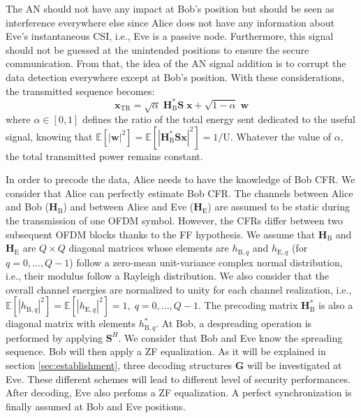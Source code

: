 \documentclass[journal,comsoc]{IEEEtran}
\newcommand{\module}[1]{\left|#1\right|}
\newcommand{\EX}[1]{\mathbb{E} \left[#1\right]}%
\newcommand{\HE}{\textbf{H}_{\text{E}}}
\newcommand{\HB}{\textbf{H}_{\text{B}}}
\newcommand{\spread}{\textbf{S}}
\newcommand{\w}{\textbf{w}}
\newcommand{\vect}[1]{\boldsymbol{\mathrm{#1}}}
\begin{document}
The AN should not have any impact at Bob's position but should be seen as interference everywhere else since Alice does not have any information about Eve's instantaneous CSI, i.e., Eve is a passive node. Furthermore, this signal should not be guessed at the unintended positions to ensure the secure communication. From that, the idea of the AN signal addition is to corrupt the data detection everywhere except at Bob's position. With these considerations, the transmitted sequence becomes:
\begin{equation}
	\textbf{x}_{\text{TR}} = \sqrt{\alpha} \;\HB^*  \spread\; \textbf{x} +  \sqrt{1-\alpha} \; \w
	\label{eq:sym_rad_AN}
\end{equation} 
where $\alpha \in [0,1]$ defines the ratio of the total energy sent dedicated to the useful signal, knowing that $\EX{\module{\w}^2} = \EX{\module{\HB^*\spread\textbf{x}}^2} =  1/\vect{U}$. Whatever the value of $\alpha$, the total transmitted power remains constant.

In order to precode the data, Alice needs to have the knowledge of Bob CFR. We consider that Alice can perfectly estimate Bob CFR. The channels between Alice and Bob ($\HB$) and between Alice and Eve ($\HE$) are assumed to be static during the transmission of one OFDM symbol. However, the CFRs differ between two subsequent OFDM blocks thanks to the FF hypothesis. We assume that $\HB$ and $\HE$ are $Q\times Q$ diagonal matrices whose elements are $h_{\text{B},q}$ and $h_{\text{E},q}$ (for $q = 0,...,Q-1$) follow a zero-mean unit-variance complex normal distribution, i.e., their modulus follow a Rayleigh distribution. We also consider that the overall channel energies are normalized to unity for each channel realization, i.e., $\mathbb{E}\left[\left|h_{\text{B},q}\right|^2\right]  = \mathbb{E}\left[\left|h_{\text{E},q}\right|^2\right] = 1, \; q = 0,...,Q-1$. The precoding matrix $\HB^*$ is also a diagonal matrix with elements $h_{\text{B},q}^*$. At Bob, a despreading operation is performed by applying $\spread^H$. We consider that Bob and Eve know the spreading sequence. Bob will then apply a ZF equalization.  As it will be explained in section \ref{sec:establishment}, three decoding structures $\textbf{G}$ will be investigated at Eve. These different schemes will lead to different level of security performances. After decoding, Eve also perfoms a ZF equalization. A perfect synchronization is finally assumed at Bob and Eve positions.\\
\end{document}
